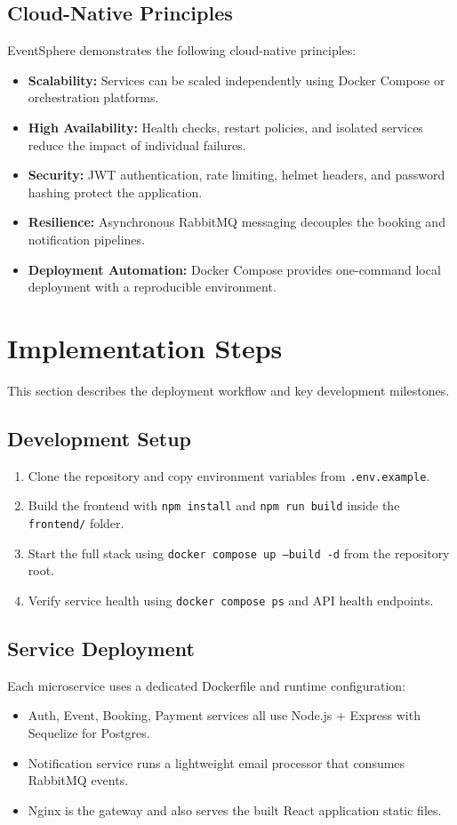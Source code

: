 \documentclass[12pt,a4paper]{article}
\begin{document}
\subsection{Cloud-Native Principles}
EventSphere demonstrates the following cloud-native principles:
\begin{itemize}[itemsep=0.4em]
    \item \textbf{Scalability:} Services can be scaled independently using Docker Compose or orchestration platforms.
    \item \textbf{High Availability:} Health checks, restart policies, and isolated services reduce the impact of individual failures.
    \item \textbf{Security:} JWT authentication, rate limiting, helmet headers, and password hashing protect the application.
    \item \textbf{Resilience:} Asynchronous RabbitMQ messaging decouples the booking and notification pipelines.
    \item \textbf{Deployment Automation:} Docker Compose provides one-command local deployment with a reproducible environment.
\end{itemize}

\section{Implementation Steps}
This section describes the deployment workflow and key development milestones.

\subsection{Development Setup}
\begin{enumerate}[itemsep=0.5em]
    \item Clone the repository and copy environment variables from \texttt{.env.example}.
    \item Build the frontend with \texttt{npm install} and \texttt{npm run build} inside the \texttt{frontend/} folder.
    \item Start the full stack using \texttt{docker compose up --build -d} from the repository root.
    \item Verify service health using \texttt{docker compose ps} and API health endpoints.
\end{enumerate}

\subsection{Service Deployment}
Each microservice uses a dedicated Dockerfile and runtime configuration:
\begin{itemize}[itemsep=0.4em]
    \item Auth, Event, Booking, Payment services all use Node.js + Express with Sequelize for Postgres.
    \item Notification service runs a lightweight email processor that consumes RabbitMQ events.
    \item Nginx is the gateway and also serves the built React application static files.
\end{itemize}
\end{document}
